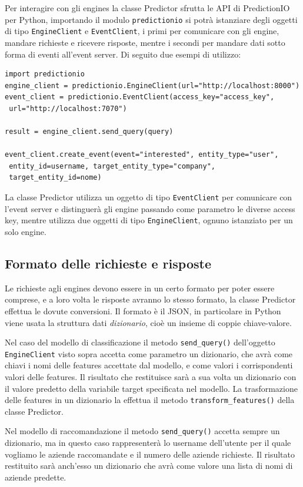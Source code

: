 Per interagire con gli engines la classe Predictor sfrutta le API di PredictionIO per Python, importando il modulo \verb+predictionio+ si potrà istanziare degli oggetti di tipo \verb+EngineClient+ e \verb+EventClient+, i primi per comunicare con gli engine, mandare richieste e ricevere risposte, mentre i secondi per mandare dati sotto forma di eventi all'event server. Di seguito due esempi di utilizzo:
\begin{verbatim}
import predictionio
engine_client = predictionio.EngineClient(url="http://localhost:8000")
event_client = predictionio.EventClient(access_key="access_key", 
 url="http://localhost:7070")

result = engine_client.send_query(query)

event_client.create_event(event="interested", entity_type="user", 
 entity_id=username, target_entity_type="company",
 target_entity_id=nome)
\end{verbatim}

La classe Predictor utilizza un oggetto di tipo \verb+EventClient+ per comunicare con l'event server e distinguerà gli engine passando come parametro le diverse access key, mentre utilizza due oggetti di tipo \verb+EngineClient+, ognuno istanziato per un solo engine.

\subsection{Formato delle richieste e risposte}
Le richieste agli engines devono essere in un certo formato per poter essere comprese, e a loro volta le risposte avranno lo stesso formato, la classe Predictor effettua le dovute conversioni. Il formato è il JSON, in particolare in Python viene usata la struttura dati \textit{dizionario}, cioè un insieme di coppie chiave-valore. 

Nel caso del modello di classificazione il metodo \verb+send_query()+ dell'oggetto \verb+EngineClient+ visto sopra accetta come parametro un dizionario, che avrà come chiavi i nomi delle features accettate dal modello, e come valori i corrispondenti valori delle features. Il risultato che restituisce sarà a sua volta un dizionario con il valore predetto della variabile target specificata nel modello. La trasformazione delle features in un dizionario la effettua il metodo \verb+transform_features()+ della classe Predictor.

Nel modello di raccomandazione il metodo \verb+send_query()+ accetta sempre un dizionario, ma in questo caso rappresenterà lo username dell'utente per il quale vogliamo le aziende raccomandate e il numero delle aziende richieste. Il risultato restituito sarà anch'esso un dizionario che avrà come valore una lista di nomi di aziende predette.

